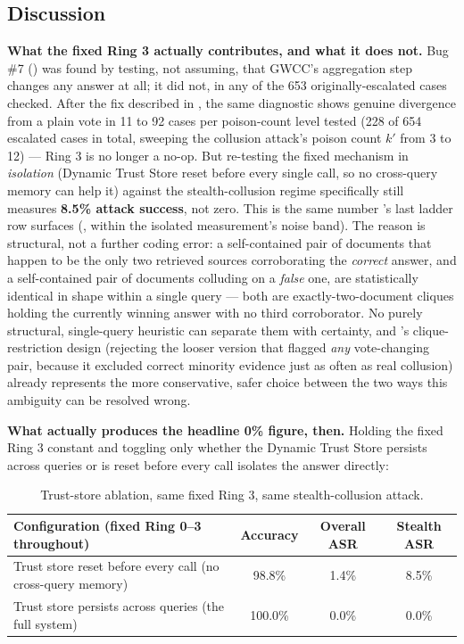 \subsection{Discussion}
\label{sec:discussion}

\textbf{What the fixed Ring 3 actually contributes, and what it does not.}
Bug \#7 () was found by testing, not assuming, that
GWCC's aggregation step changes any answer at all; it did not, in any of the
653 originally-escalated cases checked. After the fix described in
, the same diagnostic shows genuine divergence from a plain
vote in 11 to 92 cases per poison-count level tested (228 of 654 escalated
cases in total, sweeping the collusion attack's poison count $k'$ from 3 to
12) --- Ring 3 is no longer a no-op. But re-testing the fixed mechanism in
\emph{isolation} (Dynamic Trust Store reset before every single call, so no
cross-query memory can help it) against the stealth-collusion regime
specifically still measures \textbf{8.5\% attack success}, not zero. This
is the same number 's last ladder row surfaces
(, within the isolated measurement's noise band). The reason
is structural, not a further coding error: a self-contained pair of
documents that happen to be the only two retrieved sources corroborating
the \emph{correct} answer, and a self-contained pair of documents colluding
on a \emph{false} one, are statistically identical in shape within a single
query --- both are exactly-two-document cliques holding the currently
winning answer with no third corroborator. No purely structural,
single-query heuristic can separate them with certainty, and
's clique-restriction design (rejecting the looser
version that flagged \emph{any} vote-changing pair, because it excluded
correct minority evidence just as often as real collusion) already
represents the more conservative, safer choice between the two ways this
ambiguity can be resolved wrong.

\textbf{What actually produces the headline 0\% figure, then.} Holding the
fixed Ring 3 constant and toggling only whether the Dynamic Trust Store
persists across queries or is reset before every call isolates the answer
directly:

\begin{table}[htbp]
\centering
\small
\begin{tabularx}{\textwidth}{@{}Y c c c@{}}
\toprule
\textbf{Configuration (fixed Ring 0--3 throughout)} & \textbf{Accuracy} & \textbf{Overall ASR} & \textbf{Stealth ASR} \\
\midrule
Trust store reset before every call (no cross-query memory) & 98.8\% & 1.4\% & 8.5\% \\
Trust store persists across queries (the full system) & 100.0\% & 0.0\% & 0.0\% \\
\bottomrule
\end{tabularx}
\caption{Trust-store ablation, same fixed Ring 3, same stealth-collusion attack.}
\label{tab:trust-ablation}
\end{table}

